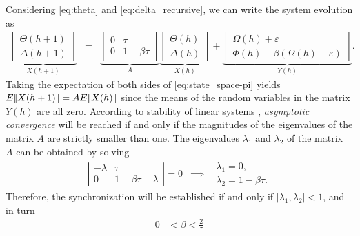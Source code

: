 Considering \eqref{eq:theta} and \eqref{eq:delta_recursive}, we can write the 
system evolution as
\begin{eqnarray}
\underset{X(h+1)}{
	\underbrace{
		\left[\!\!\!\begin{array}{c}
		\Theta(h\!+\!1)\\
		\Delta(h\!+\!1)
		\end{array}\!\!\!\right]
	}
} &\!\!\!\!\!\!\! =\!\!\!\!\!\!\! & 
\underset{A}{
	\underbrace{
		\left[\!\!\!\begin{array}{cc}
		0 & \tau\\
		0 & 1\!-\!\beta\tau
		\end{array}\!\!\!\right]
	}
}
\underset{X(h)}{
	\underbrace{
		\left[\!\!\!\begin{array}{c}
		\Theta(\!h\!)\\
		\Delta(\!h\!)
		\end{array}\!\!\!\right]}
}
\!\!+\!\!
\underset{Y(h)}{
	\underbrace{
		\left[\!\!\!\begin{array}{c}
		\Omega(h)+\varepsilon\\
		\Phi(\!h\!)\!-\!\beta(\Omega(\!h\!)\!+\!\varepsilon)
		\end{array}\!\!\!\right]}
}.\label{eq:state_space-pi}
\end{eqnarray}
Taking the expectation of both sides of \eqref{eq:state_space-pi} yields 
$E\!\left\llbracket X(h+1) \right\rrbracket = AE\!\left\llbracket X(h) \right\rrbracket$ since 
the means of the random variables in the matrix $Y(h)$ are all zero. According 
to stability of linear systems \cite{book-luenberger}, \emph{asymptotic 
	convergence} will be reached if and only if the magnitudes of the 
eigenvalues of the matrix $A$ are strictly smaller than one. The eigenvalues 
$\lambda_1$ and $\lambda_2$ of the matrix $A$ can be obtained 
by solving
\begin{eqnarray}
\left|\begin{array}{cc}
-\lambda & \tau\\
0 & 1-\beta\tau-\lambda
\end{array}\right|=0 &\implies& 
\begin{array}{c}
\lambda_1 = 0,\\
\lambda_2 = 1-\beta\tau.  
\end{array}\label{eq:eigens}
\end{eqnarray}
Therefore, the synchronization will be  established if 
and only if $|\lambda_1,\lambda_2|<1$, and in turn
\begin{align}
0 & <\beta<\frac{2}{\tau}\label{eq:step_size_bounds-pi}
\end{align}
